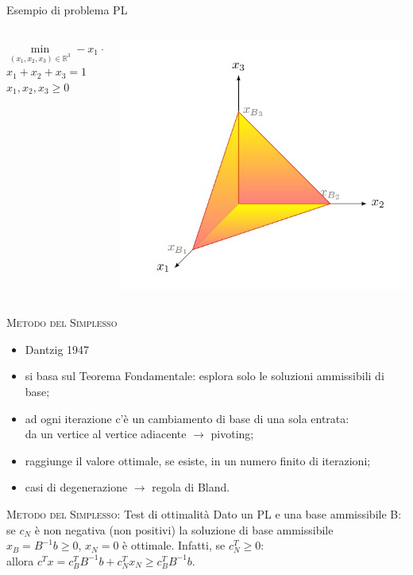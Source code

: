\begin{frame}{Esempio di problema PL}
\begin{columns}
\begin{column}{.6\textwidth}
$\min\limits_{(x_{1},x_{2},x_{3})\in\mathbb{R}^{3}} -x_{1}+ x_{2}-4x_{3}$\\
$x_{1}+x_{2}+x_{3}=1$\\
 $x_{1}, x_{2}, x_{3} \geq 0$
\end{column}
\pause
\begin{column}{.4\textwidth}
\includegraphics[width=\columnwidth]{Feas.jpg}
\end{column}
\end{columns}
\end{frame}
%
%
\begin{frame}{\textsc{Metodo del Simplesso}}
\begin{itemize}
	\pause
	\item Dantzig 1947
	\pause
	\item si basa sul Teorema Fondamentale:
	esplora solo le soluzioni ammissibili di base; 
	\pause
	\item ad ogni iterazione c'è un cambiamento di base di una sola entrata: \\da un vertice al vertice adiacente $\rightarrow$ pivoting;
	\pause
	\item raggiunge
	il valore ottimale, se esiste, in un numero finito di iterazioni;
	\pause
	\item casi di degenerazione $\rightarrow$ regola di Bland. 
\end{itemize}
\end{frame}
%
%
\begin{frame}{\textsc{Metodo del Simplesso}: Test di ottimalità}
Dato un PL e una base ammissibile B: se $c_{N}$ è non
negativa (non positivi) la soluzione di base ammissibile
$x_{B} = B^{-1}b \geq 0$, $x_{N} = 0$ è ottimale.
Infatti, se
$c_{N}^{T} \geq 0$:\\
allora $c^{T}x = c^{T}_{B} B^{-1}b + c^{T}_{N}x_{N} \geq c^{T}_{B}B^{-1}b$.
\end{frame}

